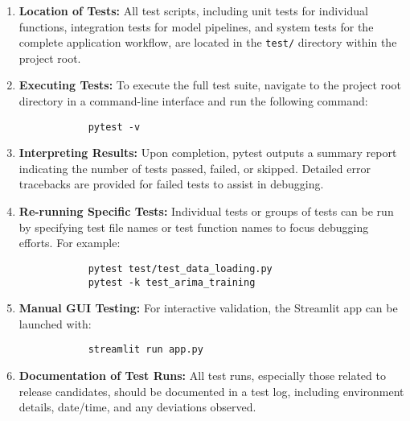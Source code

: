\begin{enumerate}
	\item \textbf{Location of Tests:} All test scripts, including unit tests for individual functions, integration tests for model pipelines, and system tests for the complete application workflow, are located in the \texttt{test/} directory within the project root.
	
	\item \textbf{Executing Tests:} To execute the full test suite, navigate to the project root directory in a command-line interface and run the following command:
	
	\begin{framed}
		\begin{verbatim}
			pytest -v
		\end{verbatim}
	\end{framed}
	
	\item \textbf{Interpreting Results:} Upon completion, pytest outputs a summary report indicating the number of tests passed, failed, or skipped. Detailed error tracebacks are provided for failed tests to assist in debugging.
	
	\item \textbf{Re-running Specific Tests:} Individual tests or groups of tests can be run by specifying test file names or test function names to focus debugging efforts. For example:
	
	\begin{framed}
		\begin{verbatim}
			pytest test/test_data_loading.py
			pytest -k test_arima_training
		\end{verbatim}
	\end{framed}
	
	\item \textbf{Manual GUI Testing:} For interactive validation, the Streamlit app can be launched with:
	
	\begin{framed}
		\begin{verbatim}
			streamlit run app.py
		\end{verbatim}
	\end{framed}
	
	\item \textbf{Documentation of Test Runs:} All test runs, especially those related to release candidates, should be documented in a test log, including environment details, date/time, and any deviations observed.
\end{enumerate}


